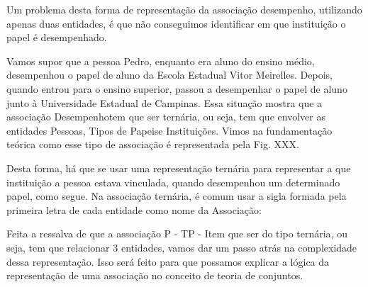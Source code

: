 \documentclass[
12pt,		%
openright,	%
twoside,  %
a4paper,			%
chapter=TITLE,		%
english,			%
french,				%
spanish,			%
brazil				%
]{USPSC-classe/USPSC}
\begin{document}
Um problema desta forma de representa\c{c}\~ao da associa\c{c}\~ao desempenho, utilizando apenas duas entidades, \'e que n\~ao conseguimos identificar em que institui\c{c}\~ao o papel \'e desempenhado.










Vamos supor que a pessoa \textquotedbl Pedro\textquotedbl , enquanto era aluno do ensino m\'edio, desempenhou o papel de aluno da Escola Estadual Vitor Meirelles. Depois, quando entrou para o ensino superior, passou a desempenhar o papel de aluno junto \`a Universidade Estadual de Campinas. Essa situa\c{c}\~ao mostra que a associa\c{c}\~ao \textquotedbl Desempenho\textquotedbl  tem que ser tern\'aria, ou seja, tem que envolver as entidades \textquotedbl Pessoas\textquotedbl , \textquotedbl Tipos de Papeis\textquotedbl  e \textquotedbl Institui\c{c}\~oes\textquotedbl . Vimos na fundamenta\c{c}\~ao te\'orica como esse tipo de associa\c{c}\~ao \'e representada pela Fig. XXX.










Desta forma, h\'a que se usar uma representa\c{c}\~ao tern\'aria para representar \textquotedbl a que institui\c{c}\~ao a pessoa estava vinculada, quando desempenhou um determinado papel\textquotedbl , como segue. Na associa\c{c}\~ao tern\'aria, \'e comum usar a sigla formada pela primeira letra de cada entidade como nome da Associa\c{c}\~ao:












Feita a ressalva de que a associa\c{c}\~ao \textquotedbl P - TP - I\textquotedbl  tem que ser do tipo tern\'aria, ou seja, tem que relacionar 3 entidades, vamos dar um passo atr\'as na complexidade dessa representa\c{c}\~ao. Isso ser\'a feito para que possamos explicar a l\'ogica da representa\c{c}\~ao de uma associa\c{c}\~ao no conceito de teoria de conjuntos.
\end{document}
